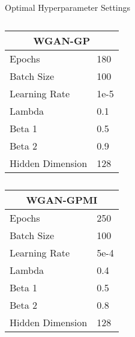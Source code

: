 \begin{table}[!htb]
	\centering
	\caption{Optimal Hyperparameter Settings}
	\label{tab:params}
	\begin{subtable}{.5\linewidth}
		\centering
		\caption{}
		\begin{tabular}{l|l}
			\hline
			\multicolumn{2}{c}{\textbf{WGAN-GP}} \\ 
			\hline
			Epochs & 180 \\
			Batch Size & 100 \\
			Learning Rate & 1e-5 \\
			Lambda & 0.1 \\
			Beta 1 & 0.5 \\
			Beta 2 & 0.9 \\
			Hidden Dimension & 128                  
		\end{tabular}
	\end{subtable}%
	\begin{subtable}{.5\linewidth}
		\centering
		\caption{}
		\begin{tabular}{l|l}
			\hline
			\multicolumn{2}{c}{\textbf{ WGAN-GPMI}} \\ 
			\hline
			Epochs & 250 \\
			Batch Size & 100 \\
			Learning Rate & 5e-4 \\
			Lambda & 0.4 \\
			Beta 1 & 0.5 \\
			Beta 2 & 0.8 \\
			Hidden Dimension & 128                  
		\end{tabular}
	\end{subtable}%
\end{table}
